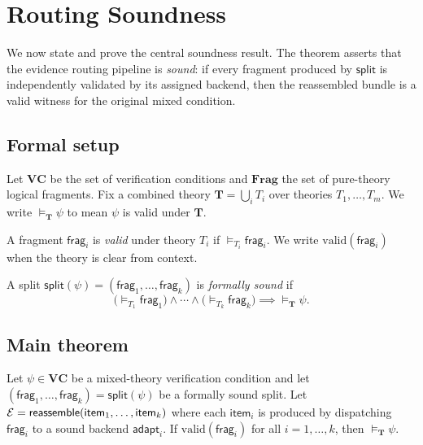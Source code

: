 \documentclass[11pt]{article}
\newcommand{\VC}{\psi}                    %
\newcommand{\Frag}[1]{\mathsf{frag}_{#1}} %
\newcommand{\Split}{\mathsf{split}}       %
\newcommand{\Reassemble}{\mathsf{reassemble}} %
\newcommand{\BAdapt}{\mathsf{adapt}}      %
\newcommand{\valid}[1]{\mathrm{valid}(#1)}
\begin{document}
\section{Routing Soundness}\label{sec:soundness}

We now state and prove the central soundness result.  The theorem
asserts that the evidence routing pipeline is \emph{sound}: if every
fragment produced by $\Split$ is independently validated by its
assigned backend, then the reassembled bundle is a valid witness for
the original mixed condition.

\subsection{Formal setup}\label{sec:formal-setup}

Let $\mathbf{VC}$ be the set of verification conditions and
$\mathbf{Frag}$ the set of pure-theory logical fragments.  Fix a
combined theory $\mathbf{T} = \bigcup_i T_i$ over theories
$T_1, \ldots, T_m$.  We write $\models_{\mathbf{T}} \VC$ to mean
$\VC$ is valid under $\mathbf{T}$.

\begin{definition}\label{def:frag-valid}
A fragment $\Frag{i}$ is \emph{valid} under theory $T_i$ if
$\models_{T_i} \Frag{i}$.  We write $\valid{\Frag{i}}$ when the
theory is clear from context.
\end{definition}

\begin{definition}\label{def:formal-split}
A split $\Split(\VC) = (\Frag{1}, \ldots, \Frag{k})$ is \emph{formally
sound} if
\[
  \bigl(\models_{T_1} \Frag{1}\bigr) \wedge \cdots \wedge
  \bigl(\models_{T_k} \Frag{k}\bigr)
  \implies
  \models_{\mathbf{T}} \VC.
\]
\end{definition}

\subsection{Main theorem}\label{sec:main-theorem}

\begin{theorem}\label{thm:routing-soundness}
Let $\VC \in \mathbf{VC}$ be a mixed-theory verification condition and
let $(\Frag{1}, \ldots, \Frag{k}) = \Split(\VC)$ be a formally sound
split.  Let $\evid = \Reassemble(\mathsf{item}_1, \ldots, \mathsf{item}_k)$
where each $\mathsf{item}_i$ is produced by dispatching $\Frag{i}$ to
a sound backend $\BAdapt_i$.  If $\valid{\Frag{i}}$ for all
$i = 1, \ldots, k$, then $\models_{\mathbf{T}} \VC$.
\end{theorem}
\end{document}
